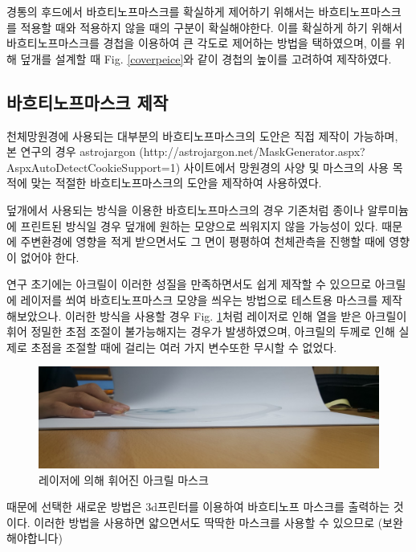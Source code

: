 \documentclass[twoside,11pt]{gshs_thesis}
\begin{document}
경통의 후드에서 바흐티노프마스크를 확실하게 제어하기 위해서는 바흐티노프마스크를 적용할 때와 적용하지 않을 때의 구분이 확실해야한다. 이를 확실하게 하기 위해서 바흐티노프마스크를 경첩을 이용하여 큰 각도로 제어하는 방법을 택하였으며, 이를 위해 덮개를 설계할 때 Fig. \ref{coverpeice}와 같이 경첩의 높이를 고려하여 제작하였다.

\subsection{바흐티노프마스크 제작}
천체망원경에 사용되는 대부분의 바흐티노프마스크의 도안은 직접 제작이 가능하며, 본 연구의 경우 astrojargon (http://astrojargon.net/MaskGenerator.aspx?AspxAutoDetectCookieSupport=1) 사이트에서 망원경의 사양 및 마스크의 사용 목적에 맞는 적절한 바흐티노프마스크의 도안을 제작하여 사용하였다.

덮개에서 사용되는 방식을 이용한 바흐티노프마스크의 경우 기존처럼 종이나 알루미늄에 프린트된 방식일 경우 덮개에 원하는 모양으로 씌워지지 않을 가능성이 있다. 때문에 주변환경에 영향을 적게 받으면서도 그 면이 평평하여 천체관측을 진행할 때에 영향이 없어야 한다. 


연구 초기에는 아크릴이 이러한 성질을 만족하면서도 쉽게 제작할 수 있으므로 아크릴에 레이저를 쐬여 바흐티노프마스크 모양을 씌우는 방법으로 테스트용 마스크를 제작해보았으나. 이러한 방식을 사용할 경우 Fig. \ref{bendmask}처럼 레이저로 인해 열을 받은 아크릴이 휘어 정밀한 초점 조절이 불가능해지는 경우가 발생하였으며, 아크릴의 두께로 인해 실제로 초점을 조절할 때에 걸리는 여러 가지 변수또한 무시할 수 없었다.

\bigskip
\begin{figure}[h]
	\begin{center}
		\includegraphics[width = 12 cm]{bendmask}
	\end{center}
	\caption{레이저에 의해 휘어진 아크릴 마스크}
	\label{bendmask}
\end{figure}


때문에 선택한 새로운 방법은 3d프린터를 이용하여 바흐티노프 마스크를 출력하는 것이다. 이러한 방법을 사용하면 얇으면서도 딱딱한 마스크를 사용할 수 있으므로 (보완해야합니다)~~~~~
\end{document}
